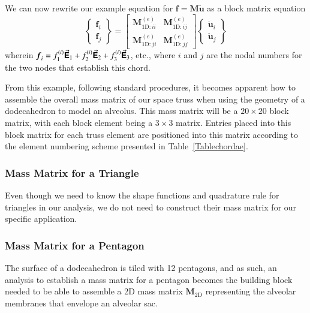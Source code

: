 We can now rewrite our example equation for $\boldsymbol{f} = \mathbf{M} \ddot{\boldsymbol{u}}$ as a block matrix equation
\begin{displaymath}
\left\{ \begin{matrix} 
\boldsymbol{f}_i \\ \boldsymbol{f}_j
\end{matrix} \right\} = 
\begin{bmatrix}
\mathbf{M}^{(e)}_{\mathrm{1D}:ii} & \mathbf{M}^{(e)}_{\mathrm{1D}:ij} \\
\mathbf{M}^{(e)}_{\mathrm{1D}:ji} & \mathbf{M}^{(e)}_{\mathrm{1D}:jj}
\end{bmatrix} \left\{ \begin{matrix} 
\ddot{\boldsymbol{u}}_i \\ \ddot{\boldsymbol{u}}_j
\end{matrix} \right\}
\end{displaymath} 
wherein $\boldsymbol{f}_i = f^{(i)}_1 \vec{\boldsymbol{\mathsf{E}}}_1 + f^{(i)}_2 \vec{\boldsymbol{\mathsf{E}}}_2 + f^{(i)}_3 \vec{\boldsymbol{\mathsf{E}}}_3$, etc., where $i$ and $j$ are the nodal numbers for the two nodes that establish this chord.

From this example, following standard procedures, \cite{ClaytonChung18} it becomes apparent how to assemble the overall mass matrix of our space truss when using the geometry of a dodecahedron to model an alveolus.  This mass matrix will be a $20 \! \times \! 20$ block matrix, with each block element being a $3 \! \times \! 3$ matrix.  Entries placed into this block matrix for each truss element are positioned into this matrix according to the element numbering scheme presented in Table~\ref{Tablechordae}.

\subsubsection{Mass Matrix for a Triangle}

Even though we need to know the shape functions and quadrature rule for triangles in our analysis, we do not need to construct their mass matrix for our specific application.

\subsubsection{Mass Matrix for a Pentagon}

The surface of a dodecahedron is tiled with 12 pentagons, and as such, an analysis to establish a mass matrix for a pentagon becomes the building block needed to be able to assemble a 2D mass matrix $\mathbf{M}_{\mathrm{2D}}$ representing the alveolar membranes that envelope an alveolar sac.

